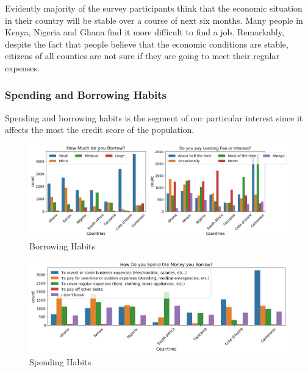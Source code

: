 Evidently majority of the survey participants think that the economic
situation in their country will be stable over a course of next six
months. Many people in Kenya, Nigeria and Ghana find it more difficult
to find a job. Remarkably, despite the fact that people believe that the
economic conditions are stable, citizens of all counties are not sure if
they are going to meet their regular expenses.

\hypertarget{spending-and-borrowing-habits}{%
\subsubsection{Spending and Borrowing
Habits}\label{spending-and-borrowing-habits}}

Spending and borrowing habits is the segment of our particular interest
since it affects the most the credit score of the population.

\begin{Schunk}
\begin{figure}[H]

{\centering \includegraphics[width=1.15\linewidth]{../../artifacts/borrowing} 

}

\caption[Borrowing Habits]{Borrowing Habits}\label{fig:bh}
\end{figure}
\end{Schunk}

\begin{Schunk}
\begin{figure}[H]

{\centering \includegraphics[width=1.15\linewidth]{../../artifacts/spending} 

}

\caption[Spending Habits]{Spending Habits}\label{fig:sh}
\end{figure}
\end{Schunk}

